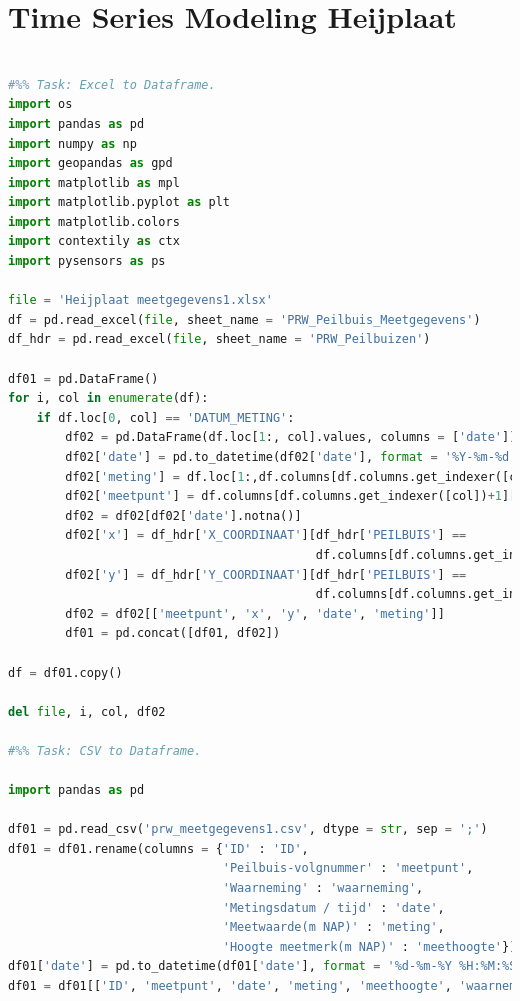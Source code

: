 \section{Time Series Modeling Heijplaat}
\begin{lstlisting}[language=Python]

#%% Task: Excel to Dataframe. 
import os 
import pandas as pd
import numpy as np
import geopandas as gpd 
import matplotlib as mpl
import matplotlib.pyplot as plt 
import matplotlib.colors
import contextily as ctx
import pysensors as ps 

file = 'Heijplaat meetgegevens1.xlsx'
df = pd.read_excel(file, sheet_name = 'PRW_Peilbuis_Meetgegevens')
df_hdr = pd.read_excel(file, sheet_name = 'PRW_Peilbuizen')
 
df01 = pd.DataFrame()
for i, col in enumerate(df):
    if df.loc[0, col] == 'DATUM_METING':
        df02 = pd.DataFrame(df.loc[1:, col].values, columns = ['date'])
        df02['date'] = pd.to_datetime(df02['date'], format = '%Y-%m-%d %H:%M:%S').dt.strftime('%Y-%m-%d')
        df02['meting'] = df.loc[1:,df.columns[df.columns.get_indexer([col])+1][0]].values
        df02['meetpunt'] = df.columns[df.columns.get_indexer([col])+1][0]
        df02 = df02[df02['date'].notna()]
        df02['x'] = df_hdr['X_COORDINAAT'][df_hdr['PEILBUIS'] == 
                                           df.columns[df.columns.get_indexer([col])+1][0]].values[0]
        df02['y'] = df_hdr['Y_COORDINAAT'][df_hdr['PEILBUIS'] == 
                                           df.columns[df.columns.get_indexer([col])+1][0]].values[0]
        df02 = df02[['meetpunt', 'x', 'y', 'date', 'meting']]
        df01 = pd.concat([df01, df02])

df = df01.copy()

del file, i, col, df02

#%% Task: CSV to Dataframe. 

import pandas as pd

df01 = pd.read_csv('prw_meetgegevens1.csv', dtype = str, sep = ';') 
df01 = df01.rename(columns = {'ID' : 'ID',
                              'Peilbuis-volgnummer' : 'meetpunt',
                              'Waarneming' : 'waarneming',
                              'Metingsdatum / tijd' : 'date',
                              'Meetwaarde(m NAP)' : 'meting',
                              'Hoogte meetmerk(m NAP)' : 'meethoogte'}) 
df01['date'] = pd.to_datetime(df01['date'], format = '%d-%m-%Y %H:%M:%S').dt.strftime('%Y-%m-%d')
df01 = df01[['ID', 'meetpunt', 'date', 'meting', 'meethoogte', 'waarneming']]


\end{lstlisting}
